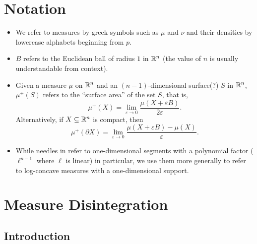 \documentclass{article}
\begin{document}
\thispagestyle{empty}
\titleBC

\setcounter{section}{-1}

\section{Notation}

\begin{itemize}
	\item We refer to measures by greek symbols such as $\mu$ and $\nu$ and their densities by lowercase alphabets beginning from $p$.
	\item $B$ refers to the Euclidean ball of radius $1$ in $\mathbb{R}^n$ (the value of $n$ is usually understandable from context).
	\item Given a measure $\mu$ on $\mathbb{R}^n$ and an $(n-1)$-dimensional surface(?) $S$ in $\mathbb{R}^n$, $\mu^+(S)$ refers to the ``surface area'' of the set $S$, that is,
	\[ \mu^+(X) = \lim_{\varepsilon \to 0} \frac{\mu(X + \varepsilon B )}{2\varepsilon}. \]
	Alternatively, if $X \subseteq \mathbb{R}^n$ is compact, then
	\[ \mu^+(\partial X) = \lim_{\varepsilon \to 0} \frac{\mu(X + \varepsilon B) - \mu(X)}{\varepsilon}. \]
	\item While needles in \cite{KLSConjecture} refer to one-dimensional segments with a polynomial factor ($\ell^{n-1}$ where $\ell$ is linear) in particular, we use them more generally to refer to log-concave measures with a one-dimensional support.
\end{itemize}

\section{Measure Disintegration}

	\subsection{Introduction}
\end{document}
